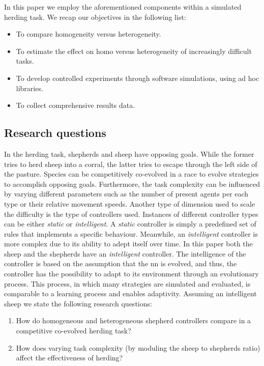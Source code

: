 \documentclass[conference]{IEEEtran}
\begin{document}
In this paper we employ the aforementioned components within a simulated herding task.
We recap our objectives in the following list:

\begin{itemize}
	\item To compare homogeneity versus heterogeneity.
	\item To estimate the effect on homo versus heterogeneity of increasingly difficult tasks.
 	\item To develop controlled experiments through software simulations, using ad hoc libraries.
	\item To collect comprehensive results data.
\end{itemize}
 
\subsection{Research questions}
\label{sec:researchQuestions}
In the herding task, shepherds and sheep have opposing goals.
While the former tries to herd sheep into a corral, the latter tries to escape through the left side of the pasture. 
Species can be competitively co-evolved in a race to evolve strategies to accomplish opposing goals. 
Furthermore, the task complexity can be influenced by varying different parameters such as the number of present agents per each type or their relative movement speeds. 
Another type of dimension used to scale the difficulty is the type of controllers used.
Instances of different controller types can be either \textit{static} or \textit{intelligent}.
A \textit{static} controller is simply a predefined set of rules that implements a specific behaviour.
Meanwhile, an \textit{intelligent} controller is more complex due to its ability to adept itself over time.
In this paper both the sheep and the shepherds have an \textit{intelligent} controller.
The intelligence of the controller is based on the assumption that the \gls{nn} is evolved, and thus, the controller has the possibility to adapt to its environment through an evolutionary process. 
This process, in which many strategies are simulated and evaluated, is comparable to a learning process and enables adaptivity. 
Assuming an intelligent sheep we state the following research questions:

\begin{enumerate}
	\item How do homogeneous and heterogeneous shepherd controllers compare in a competitive co-evolved herding task?
	\item How does varying task complexity (by moduling the sheep to shepherds ratio) affect the effectiveness of herding?
\end{enumerate}
\end{document}
